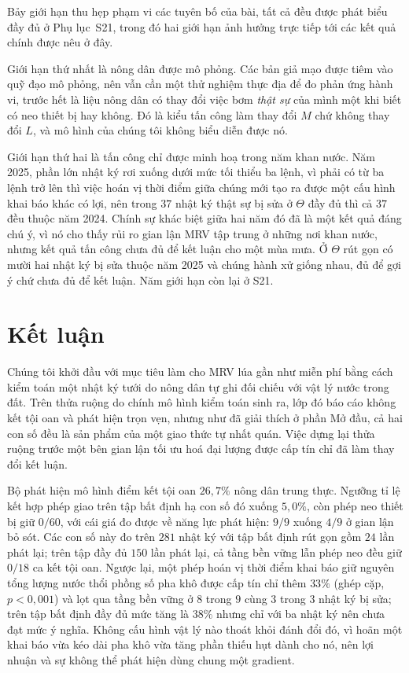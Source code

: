 Bảy giới hạn thu hẹp phạm vi các tuyên bố của bài, tất cả đều được phát biểu đầy đủ
ở Phụ lục~S21, trong đó hai giới hạn ảnh hưởng trực tiếp tới các kết quả chính được
nêu ở đây.

Giới hạn thứ nhất là nông dân được mô phỏng. Các bản giả mạo được tiêm vào quỹ
đạo mô phỏng, nên vẫn cần một thử nghiệm thực địa để đo phản ứng hành vi, trước
hết là liệu nông dân có thay đổi việc bơm \emph{thật sự} của mình một khi biết
có neo thiết bị hay không. Đó là kiểu tấn công làm thay đổi $M$ chứ không thay
đổi $L$, và mô hình của chúng tôi không biểu diễn được nó.

Giới hạn thứ hai là tấn công chỉ được minh hoạ trong năm khan nước. Năm 2025, phần lớn
nhật ký rơi xuống dưới mức tối thiểu ba lệnh, vì phải có từ ba lệnh trở lên thì việc hoán
vị thời điểm giữa chúng mới tạo ra được một cấu hình khai báo khác có lợi, nên trong $37$
nhật ký thật sự bị sửa ở $\Theta$ đầy đủ thì cả $37$ đều thuộc năm 2024. Chính sự khác biệt
giữa hai năm đó đã là một kết quả đáng chú ý, vì nó cho thấy rủi ro gian lận MRV tập trung
ở những nơi khan nước, nhưng kết quả tấn công chưa đủ để kết luận cho một mùa mưa. Ở
$\Theta$ rút gọn có mười hai nhật ký bị sửa thuộc năm 2025 và chúng hành xử giống nhau, đủ
để gợi ý chứ chưa đủ để kết luận. Năm giới hạn còn lại ở S21.

\section{Kết luận}

Chúng tôi khởi đầu với mục tiêu làm cho MRV lúa gần như miễn phí bằng cách kiểm
toán một nhật ký tưới do nông dân tự ghi đối chiếu với vật lý nước trong đất.
Trên thửa ruộng do chính mô hình kiểm toán sinh ra, lớp đó báo cáo không kết tội oan
và phát hiện trọn vẹn, nhưng như đã giải thích ở phần Mở đầu, cả hai con số đều là
sản phẩm của một giao thức tự nhất quán. Việc dựng lại thửa ruộng trước một bên gian lận
tối ưu hoá đại lượng được cấp tín chỉ đã làm thay đổi kết luận.

Bộ phát hiện mô hình điểm kết tội oan $26{,}7\%$ nông dân trung thực. Ngưỡng tỉ lệ kết hợp
phép giao trên tập bất định hạ con số đó xuống $5{,}0\%$, còn phép neo thiết bị giữ $0/60$,
với cái giá đo được về năng lực phát hiện: $9/9$ xuống $4/9$ ở gian lận bỏ sót. Các con số
này đo trên $281$ nhật ký với tập bất định rút gọn gồm $24$ lần phát lại; trên tập đầy đủ
$150$ lần phát lại, cả tầng bền vững lẫn phép neo đều giữ $0/18$ ca kết tội oan. Ngược lại, một phép
hoán vị thời điểm khai báo giữ nguyên tổng lượng nước thổi phồng số pha khô được cấp tín
chỉ thêm $33\%$ (ghép cặp, $p<0{,}001$) và lọt qua tầng bền vững ở $8$ trong $9$ cùng $3$
trong $3$ nhật ký bị sửa; trên tập bất định đầy đủ mức tăng là $38\%$ nhưng chỉ với ba nhật
ký nên chưa đạt mức ý nghĩa. Không cấu hình vật lý nào thoát khỏi đánh đổi đó, vì hoãn một
khai báo vừa kéo dài pha khô vừa tăng phần thiếu hụt dành cho nó, nên lợi nhuận và sự
không thể phát hiện dùng chung một gradient.

